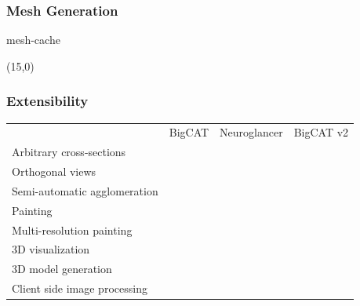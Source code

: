 \documentclass[aspectratio=169,table]{beamer}
\newcommand{\cmark}{\ding{51}}%
\newcommand{\xmark}{\ding{55}}%
\newcommand{\gcmark}{{\color{green}\cmark}}%
\newcommand{\ycmark}{{\color{yellow}\cmark}}%
\newcommand{\rxmark}{{\color{red}\xmark}}%
\begin{document}
\begin{frame}
    \frametitle{Mesh Generation}
    {
        \centering
        \vspace{3em}
        \tikzexternalenable
        {mesh-cache}
        \tikzexternaldisable
    }
    \begin{textblock}{3}(15,0)
    \end{textblock}%
\end{frame}

\begin{frame}
    \frametitle{Extensibility}
    \small
    \vspace{1cm}
    \begin{table}
        \centering
        \begin{tabular}{lccc}
                                                           & BigCAT & Neuroglancer & BigCAT v2 \\
          Arbitrary cross-sections                         & \gcmark & \gcmark & \gcmark \\
          Orthogonal views                                 & \rxmark & \gcmark & \gcmark \\
          Semi-automatic agglomeration                     & \rxmark & \rxmark & \gcmark \\
          Painting                                         & \gcmark & \rxmark & \gcmark \\
          Multi-resolution painting                        & \rxmark & \rxmark & \gcmark \\
          3D visualization                                 & \rxmark & \gcmark & \gcmark \\
          3D model generation                              & \rxmark & \rxmark & \gcmark \\
          \rowcolor{black!20} Client side image processing & \gcmark & \ycmark & \gcmark \\
        \end{tabular}
    \end{table}
\end{frame}
\end{document}
